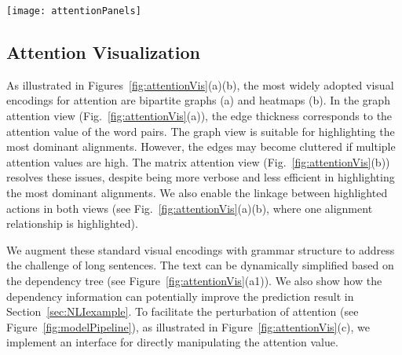 \begin{figure*}[t]
\centering
\vspace{-2mm}
 \texttt{[image: attentionPanels]}
  \vspace{-3mm}
 \caption{
Attention visualization. A bipartite graph encoding is adopted in the graph attention view (a), in which the edge thickness corresponds to the attention value. The same attention values can also be directly visualized in the matrix form (b).
The user can edit the attention values via the pop-up interface illustrated in (c).
We overlay the dependency tree ($a_1$) grammar structure to highlight important words and allow simplification of complex sentences (shown in the video).
%
For highly asymmetric attention, we utilize a zoomable hierarchical visual representation (d). The user can focus on the individual sentence by selecting the summary visualization.
}
\vspace{-3mm}
\label{fig:attentionVis}
\end{figure*}

\subsection{Attention Visualization}
As illustrated in Figures~\ref{fig:attentionVis}(a)(b), the most widely adopted visual encodings for attention are  bipartite graphs (a) and heatmaps (b). 
%
In the graph attention view (Fig.~\ref{fig:attentionVis}(a)), the edge thickness corresponds to the attention value of the word pairs. %
The graph view is suitable for highlighting the most dominant alignments. However, the edges may become cluttered if multiple attention values are high. 
The matrix attention view (Fig.~\ref{fig:attentionVis}(b)) resolves these issues, despite being more verbose and less efficient in highlighting the most dominant alignments. 
We also enable the linkage between highlighted actions in both views (see Fig.~\ref{fig:attentionVis}(a)(b), where one alignment relationship is highlighted).

We augment these standard visual encodings with grammar structure to address the challenge of long sentences.
The text can be dynamically simplified based on the dependency tree (see Figure~\ref{fig:attentionVis}(a1)). We also show how the dependency information can potentially improve the prediction result in Section~\ref{sec:NLIexample}.
%
To facilitate the perturbation of attention (see Figure~\ref{fig:modelPipeline}), as illustrated in Figure~\ref{fig:attentionVis}(c), we implement an interface for directly manipulating the attention value.

